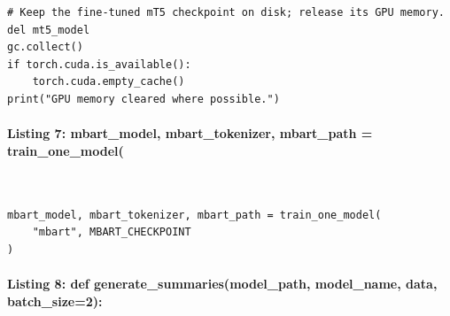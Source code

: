 \documentclass[12pt,a4paper,oneside]{report}
\begin{document}
\begin{Verbatim}[commandchars=\\\{\},breaklines=true,breakanywhere=true,fontsize=\scriptsize,frame=leftline,framesep=2mm,rulecolor=\color{gray}]
# Keep the fine-tuned mT5 checkpoint on disk; release its GPU memory.
del mt5_model
gc.collect()
if torch.cuda.is_available():
    torch.cuda.empty_cache()
print("GPU memory cleared where possible.")
\end{Verbatim}
\paragraph{Listing 7: mbart\_model, mbart\_tokenizer, mbart\_path = train\_one\_model(}\mbox{}\\[-1ex]
\begin{Verbatim}[commandchars=\\\{\},breaklines=true,breakanywhere=true,fontsize=\scriptsize,frame=leftline,framesep=2mm,rulecolor=\color{gray}]
mbart_model, mbart_tokenizer, mbart_path = train_one_model(
    "mbart", MBART_CHECKPOINT
)
\end{Verbatim}
\paragraph{Listing 8: def generate\_summaries(model\_path, model\_name, data, batch\_size=2):}\mbox{}\\[-1ex]
\end{document}
